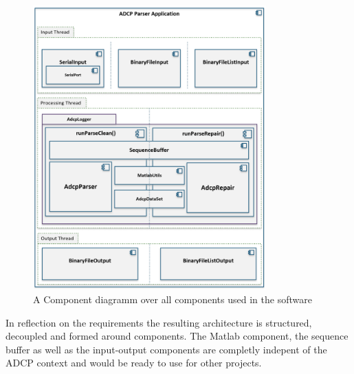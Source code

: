 \begin{figure}[h]
\centering
      \includegraphics[width=0.8\textwidth]{all_components}
        \caption{A Component diagramm over all components used in the software}
\end{figure}
In reflection on the requirements the resulting architecture is structured, decoupled and formed around components. The Matlab component, the sequence buffer as well as the input-output components are completly indepent of the ADCP context and would be ready to use for other projects.

